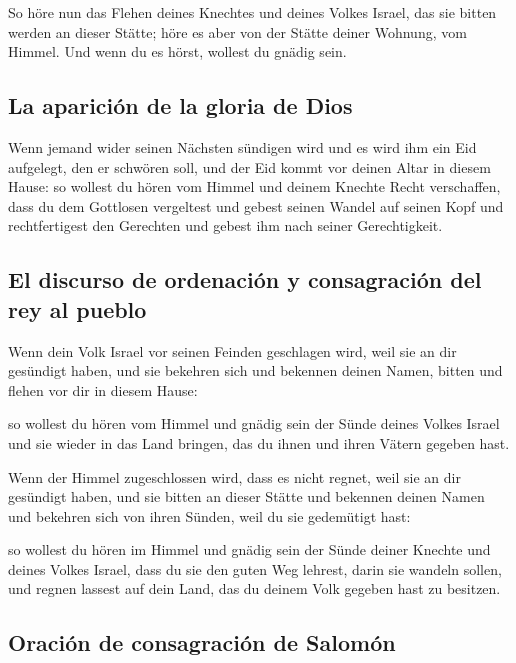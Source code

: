  So höre nun das Flehen deines Knechtes und deines Volkes
Israel, das sie bitten werden an dieser Stätte; höre es aber von der
Stätte deiner Wohnung, vom Himmel. Und wenn du es hörst, wollest du
gnädig sein.

\hypertarget{la-apariciuxf3n-de-la-gloria-de-dios}{%
\subsection{La aparición de la gloria de
Dios}\label{la-apariciuxf3n-de-la-gloria-de-dios}}

 Wenn jemand wider seinen Nächsten sündigen wird und es
wird ihm ein Eid aufgelegt, den er schwören soll, und der Eid kommt vor
deinen Altar in diesem Hause:  so wollest du hören vom
Himmel und deinem Knechte Recht verschaffen, dass du dem Gottlosen
vergeltest und gebest seinen Wandel auf seinen Kopf und rechtfertigest
den Gerechten und gebest ihm nach seiner Gerechtigkeit.

\hypertarget{el-discurso-de-ordenaciuxf3n-y-consagraciuxf3n-del-rey-al-pueblo}{%
\subsection{El discurso de ordenación y consagración del rey al
pueblo}\label{el-discurso-de-ordenaciuxf3n-y-consagraciuxf3n-del-rey-al-pueblo}}

 Wenn dein Volk Israel vor seinen Feinden geschlagen
wird, weil sie an dir gesündigt haben, und sie bekehren sich und
bekennen deinen Namen, bitten und flehen vor dir in diesem Hause:

 so wollest du hören vom Himmel und gnädig sein der Sünde
deines Volkes Israel und sie wieder in das Land bringen, das du ihnen
und ihren Vätern gegeben hast.

 Wenn der Himmel zugeschlossen wird, dass es nicht
regnet, weil sie an dir gesündigt haben, und sie bitten an dieser Stätte
und bekennen deinen Namen und bekehren sich von ihren Sünden, weil du
sie gedemütigt hast:

 so wollest du hören im Himmel und gnädig sein der Sünde
deiner Knechte und deines Volkes Israel, dass du sie den guten Weg
lehrest, darin sie wandeln sollen, und regnen lassest auf dein Land, das
du deinem Volk gegeben hast zu besitzen.

\hypertarget{oraciuxf3n-de-consagraciuxf3n-de-salomuxf3n}{%
\subsection{Oración de consagración de
Salomón}\label{oraciuxf3n-de-consagraciuxf3n-de-salomuxf3n}}

